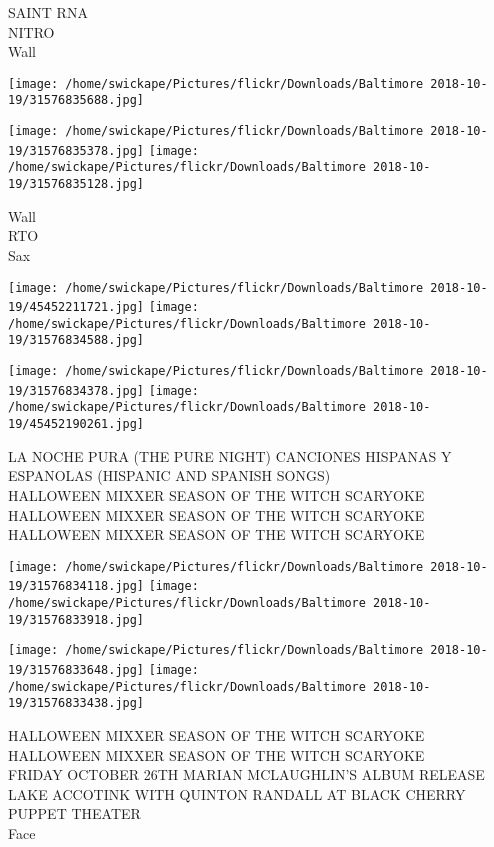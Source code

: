 \documentclass[10pt,letterpaper]{article}
\begin{document}
SAINT RNA\\
NITRO\\
Wall\\
\pagebreak

\texttt{[image: /home/swickape/Pictures/flickr/Downloads/Baltimore 2018-10-19/31576835688.jpg]}

\vspace{0.25in}
\texttt{[image: /home/swickape/Pictures/flickr/Downloads/Baltimore 2018-10-19/31576835378.jpg]}
\texttt{[image: /home/swickape/Pictures/flickr/Downloads/Baltimore 2018-10-19/31576835128.jpg]}

Wall\\
RTO\\
Sax\\
\pagebreak

\texttt{[image: /home/swickape/Pictures/flickr/Downloads/Baltimore 2018-10-19/45452211721.jpg]}
\texttt{[image: /home/swickape/Pictures/flickr/Downloads/Baltimore 2018-10-19/31576834588.jpg]}

\texttt{[image: /home/swickape/Pictures/flickr/Downloads/Baltimore 2018-10-19/31576834378.jpg]}
\texttt{[image: /home/swickape/Pictures/flickr/Downloads/Baltimore 2018-10-19/45452190261.jpg]}

LA NOCHE PURA (THE PURE NIGHT) CANCIONES HISPANAS Y ESPANOLAS (HISPANIC AND SPANISH SONGS)\\
HALLOWEEN MIXXER SEASON OF THE WITCH SCARYOKE\\
HALLOWEEN MIXXER SEASON OF THE WITCH SCARYOKE\\
HALLOWEEN MIXXER SEASON OF THE WITCH SCARYOKE\\
\pagebreak

\texttt{[image: /home/swickape/Pictures/flickr/Downloads/Baltimore 2018-10-19/31576834118.jpg]}
\texttt{[image: /home/swickape/Pictures/flickr/Downloads/Baltimore 2018-10-19/31576833918.jpg]}

\texttt{[image: /home/swickape/Pictures/flickr/Downloads/Baltimore 2018-10-19/31576833648.jpg]}
\texttt{[image: /home/swickape/Pictures/flickr/Downloads/Baltimore 2018-10-19/31576833438.jpg]}

HALLOWEEN MIXXER SEASON OF THE WITCH SCARYOKE\\
HALLOWEEN MIXXER SEASON OF THE WITCH SCARYOKE\\
FRIDAY OCTOBER 26TH MARIAN MCLAUGHLIN'S ALBUM RELEASE LAKE ACCOTINK WITH QUINTON RANDALL AT BLACK CHERRY PUPPET THEATER\\
Face\\
\pagebreak
\end{document}
